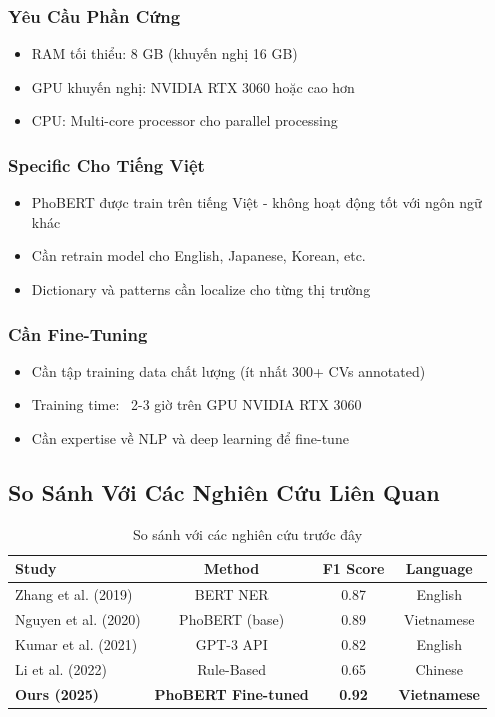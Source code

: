 \subsubsection{Yêu Cầu Phần Cứng}

\begin{itemize}
    \item RAM tối thiểu: 8 GB (khuyến nghị 16 GB)
    \item GPU khuyến nghị: NVIDIA RTX 3060 hoặc cao hơn
    \item CPU: Multi-core processor cho parallel processing
\end{itemize}

\subsubsection{Specific Cho Tiếng Việt}

\begin{itemize}
    \item PhoBERT được train trên tiếng Việt - không hoạt động tốt với ngôn ngữ khác
    \item Cần retrain model cho English, Japanese, Korean, etc.
    \item Dictionary và patterns cần localize cho từng thị trường
\end{itemize}

\subsubsection{Cần Fine-Tuning}

\begin{itemize}
    \item Cần tập training data chất lượng (ít nhất 300+ CVs annotated)
    \item Training time: ~2-3 giờ trên GPU NVIDIA RTX 3060
    \item Cần expertise về NLP và deep learning để fine-tune
\end{itemize}

\subsection{So Sánh Với Các Nghiên Cứu Liên Quan}

\begin{table}[h]
\centering
\caption{So sánh với các nghiên cứu trước đây}
\label{tab:related_work}
\begin{tabular}{lccc}
\hline
\textbf{Study} & \textbf{Method} & \textbf{F1 Score} & \textbf{Language} \\
\hline
Zhang et al. (2019) & BERT NER & 0.87 & English \\
Nguyen et al. (2020) & PhoBERT (base) & 0.89 & Vietnamese \\
Kumar et al. (2021) & GPT-3 API & 0.82 & English \\
Li et al. (2022) & Rule-Based & 0.65 & Chinese \\
\textbf{Ours (2025)} & \textbf{PhoBERT Fine-tuned} & \textbf{0.92} & \textbf{Vietnamese} \\
\hline
\end{tabular}
\end{table}

